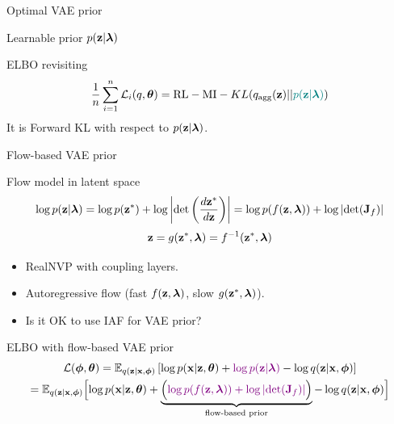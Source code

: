\begin{frame}{Optimal VAE prior}
\begin{minipage}[t]{0.5\columnwidth}
\begin{block}{Learnable prior $p(\mathbf{z} | \boldsymbol{\lambda})$}
\begin{figure}[h]
			\end{figure}
		\end{block}
	\end{minipage}
	\vspace{-0.4cm}
	\begin{block}{ELBO revisiting}
		\vspace{-0.3cm}
		\[
			\frac{1}{n}\sum_{i=1}^n \mathcal{L}_i(q, \boldsymbol{\theta}) = \text{RL} - \text{MI} -  KL(q_{\text{agg}}(\mathbf{z}) || {\color{teal}p(\mathbf{z} | \boldsymbol{\lambda})})
		\]
		It is Forward KL with respect to $p(\mathbf{z} | \boldsymbol{\lambda})$.
	\end{block}
\end{frame}
\begin{frame}{Flow-based VAE prior}
	\begin{block}{Flow model in latent space}
		\vspace{-0.5cm}
		\[
			\log p(\mathbf{z} | \boldsymbol{\lambda}) = \log p(\mathbf{z}^*) + \log  \left | \det \left(\frac{d \mathbf{z}^*}{d\mathbf{z}}\right)\right| = \log p(f(\mathbf{z}, \boldsymbol{\lambda})) + \log \left | \det (\mathbf{J}_f)\right| 
		\]
		\vspace{-0.3cm}
		\[
			\mathbf{z} = g(\mathbf{z}^*, \boldsymbol{\lambda}) = f^{-1}(\mathbf{z}^*, \boldsymbol{\lambda})
		\]
	\end{block}
	\vspace{-0.3cm}
	\begin{itemize}
		\item RealNVP with coupling layers.
		\item Autoregressive flow (fast $f(\mathbf{z}, \boldsymbol{\lambda})$, slow $g(\mathbf{z}^*, \boldsymbol{\lambda})$).
		\item {\color{gray}Is it OK to use IAF for VAE prior?}
	\end{itemize}
	\begin{block}{ELBO with flow-based VAE prior}
		\vspace{-0.5cm}
		{\small
		\begin{multline*}
			\mathcal{L}(\boldsymbol{\phi}, \boldsymbol{\theta}) = \mathbb{E}_{q(\mathbf{z} | \mathbf{x}, \boldsymbol{\phi})} \left[ \log p(\mathbf{x} | \mathbf{z}, \boldsymbol{\theta}) + {\color{violet}\log p(\mathbf{z} | \boldsymbol{\lambda})} - \log q(\mathbf{z} | \mathbf{x}, \boldsymbol{\phi}) \right] \\
				= \mathbb{E}_{q(\mathbf{z} | \mathbf{x}, \boldsymbol{\phi})} \Bigl[ \log p(\mathbf{x} | \mathbf{z}, \boldsymbol{\theta}) + \underbrace{ \Bigl({\color{violet} \log p(f(\mathbf{z}, \boldsymbol{\lambda})) + \log \left| \det (\mathbf{J}_f) \right|} \Bigr) }_{\text{flow-based prior}} - \log q(\mathbf{z} | \mathbf{x}, \boldsymbol{\phi}) \Bigr] 
		\end{multline*}
		}
	\end{block}
\end{frame}
